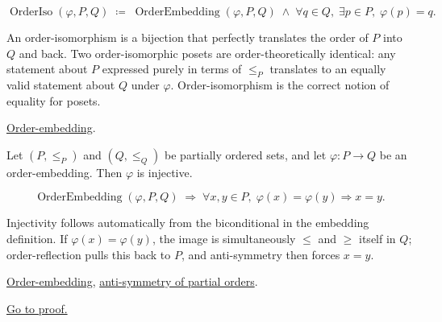 \begin{remark*}
\[
\operatorname{OrderIso}(\varphi, P, Q)
\;\coloneqq\;
\operatorname{OrderEmbedding}(\varphi, P, Q)
\;\land\;
\forall q \in Q,\; \exists p \in P,\; \varphi(p) = q.
\]
\end{remark*}

\begin{remark*}[Interpretation]
An order-isomorphism is a bijection that perfectly translates the order
of $P$ into $Q$ and back.  Two order-isomorphic posets are
order-theoretically identical: any statement about $P$ expressed purely
in terms of $\leq_P$ translates to an equally valid statement about $Q$
under $\varphi$.  Order-isomorphism is the correct notion of equality
for posets.
\end{remark*}

\begin{remark*}[Dependencies]
\hyperref[def:order-embedding]{Order-embedding}.
\end{remark*}


\begin{lemma}
\label{lem:order-embedding-injective}
Let $(P, \leq_P)$ and $(Q, \leq_Q)$ be partially ordered sets, and let
$\varphi : P \to Q$ be an order-embedding.  Then $\varphi$ is injective.
\end{lemma}

\begin{remark*}
\[
\operatorname{OrderEmbedding}(\varphi, P, Q)
\;\Longrightarrow\;
\forall x, y \in P,\; \varphi(x) = \varphi(y) \Rightarrow x = y.
\]
\end{remark*}

\begin{remark*}[Interpretation]
Injectivity follows automatically from the biconditional in the embedding
definition.  If $\varphi(x) = \varphi(y)$, the image is simultaneously
$\leq$ and $\geq$ itself in $Q$; order-reflection pulls this back to $P$,
and anti-symmetry then forces $x = y$.
\end{remark*}

\begin{remark*}[Dependencies]
\hyperref[def:order-embedding]{Order-embedding},
\hyperref[def:lattice-order-partial-order]{anti-symmetry of partial orders}.
\end{remark*}

\begin{remark*}[Proof]
\hyperref[prf:order-embedding-injective]{Go to proof.}
\end{remark*}
